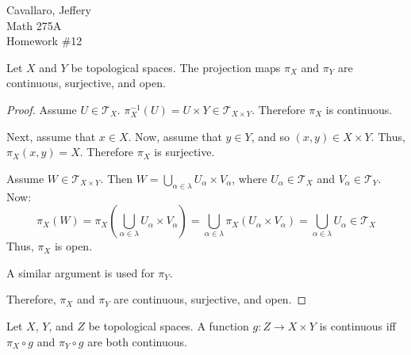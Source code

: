 \documentclass[letterpaper,12pt,fleqn]{article}
\newcommand{\T}{\mathscr{T}}
\renewcommand{\a}{\alpha}
\renewcommand{\l}{\lambda}
\begin{document}
Cavallaro, Jeffery \\
Math 275A \\
Homework \#12

\bigskip

\begin{theorem}[7.32]
  Let \(X\) and \(Y\) be topological spaces.  The projection maps \(\pi_X\) and \(\pi_Y\) are continuous,
  surjective, and open.
\end{theorem}

\begin{proof}
  Assume \(U\in\T_X\).  \(\pi_X^{-1}(U)=U\times Y\in\T_{X\times Y}\).  Therefore \(\pi_X\) is continuous.

  Next, assume that \(x\in X\).  Now, assume that \(y\in Y\), and so \((x,y)\in X\times Y\).  Thus,
  \(\pi_X(x,y)=X\).  Therefore \(\pi_X\) is surjective.

  Assume \(W\in\T_{X\times Y}\).  Then \(W=\bigcup_{\a\in\l}U_{\a}\times V_{\a}\), where \(U_{\a}\in\T_X\) and
  \(V_{\a}\in\T_Y\).  Now:
  \[\pi_X(W)=\pi_X(\bigcup_{\a\in\l}U_{\a}\times V_{\a})=\bigcup_{\a\in\l}\pi_X(U_{\a}\times V_{\a})=
  \bigcup_{\a\in\l}U_{\a}\in\T_X\]
  Thus, \(\pi_X\) is open.

  A similar argument is used for \(\pi_Y\).

  Therefore, \(\pi_X\) and \(\pi_Y\) are continuous, surjective, and open.
\end{proof}

\begin{theorem}[7.36]
  Let \(X\), \(Y\), and \(Z\) be topological spaces.  A function \(g:Z\to X\times Y\) is continuous iff
  \(\pi_X\circ g\) and \(\pi_Y\circ g\) are both continuous.
\end{theorem}
\end{document}
